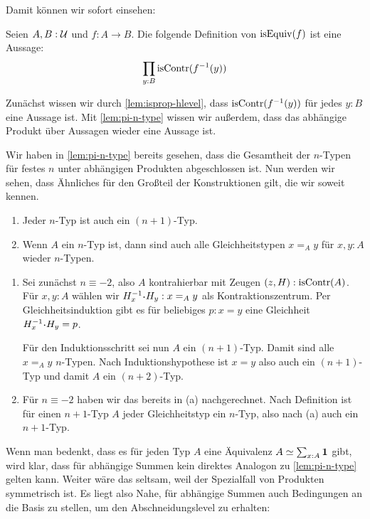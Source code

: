 Damit können wir sofort einsehen:

\begin{korollar}
  Seien $A,B:\mathcal{U}$ und $f:A\to B$.
  Die folgende Definition von $\mathrm{isEquiv}(f)$ ist eine Aussage:
  \[
    \prod_{y:B}\mathrm{isContr}(f^{-1}(y))
  \]
\end{korollar}

\begin{beweis}
  Zunächst wissen wir durch \cref{lem:isprop-hlevel}, dass $\mathrm{isContr}(f^{-1}(y))$ für jedes $y:B$ eine Aussage ist.
  Mit \cref{lem:pi-n-type} wissen wir außerdem, dass das abhängige Produkt über Aussagen wieder eine Aussage ist.
\end{beweis}

Wir haben in \cref{lem:pi-n-type} bereits gesehen, dass die Gesamtheit der $n$-Typen für festes $n$ unter abhängigen Produkten abgeschlossen ist.
Nun werden wir sehen, dass Ähnliches für den Großteil der Konstruktionen gilt, die wir soweit kennen.

\begin{bemerkung}
  \label{bem:n-type-cumulative}
  \begin{enumerate}
  \item Jeder $n$-Typ ist auch ein $(n+1)$-Typ.
  \item Wenn $A$ ein $n$-Typ ist, dann sind auch alle Gleichheitstypen $x=_A y$ für $x,y:A$ wieder $n$-Typen.
  \end{enumerate}
\end{bemerkung}
\begin{beweis}
  \begin{enumerate}
  \item Sei zunächst $n\equiv -2$, also $A$ kontrahierbar mit Zeugen $(z,H):\mathrm{isContr}(A)$.
    Für $x,y:A$ wählen wir $H^{-1}_x\kon H_y: x=_A y$ als Kontraktionszentrum.
    Per Gleichheitsinduktion gibt es für beliebiges $p:x=y$ eine Gleichheit $H_x^{-1}\kon H_y=p$.

    Für den Induktionsschritt sei nun $A$ ein $(n+1)$-Typ.
    Damit sind alle $x=_A y$ $n$-Typen. Nach Induktionshypothese ist $x=y$ also auch ein $(n+1)$-Typ und damit $A$ ein $(n+2)$-Typ.
  \item Für $n\equiv -2$ haben wir das bereits in (a) nachgerechnet.
    Nach Definition ist für einen $n+1$-Typ $A$ jeder Gleichheitstyp ein $n$-Typ, also nach (a) auch ein $n+1$-Typ.
  \end{enumerate}
\end{beweis}

Wenn man bedenkt, dass es für jeden Typ $A$ eine Äquivalenz $A\simeq \sum_{x:A}\mathbf{1}$ gibt, wird klar, dass für abhängige Summen
kein direktes Analogon zu \cref{lem:pi-n-type} gelten kann. Weiter wäre das seltsam, weil der Spezialfall von Produkten symmetrisch ist.
Es liegt also Nahe, für abhängige Summen auch Bedingungen an die Basis zu stellen, um den Abschneidungslevel zu erhalten:

